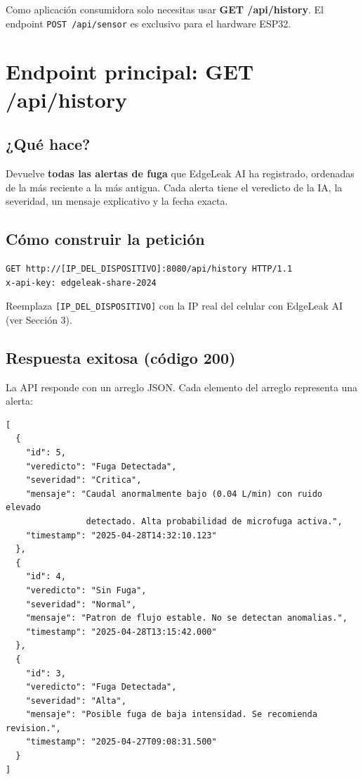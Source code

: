 \documentclass[12pt, a4paper]{article}
\begin{document}
\vspace{0.3cm}
\begin{tcolorbox}[infobox]
  Como aplicación consumidora solo necesitas usar \textbf{GET /api/history}.
  El endpoint \texttt{POST /api/sensor} es exclusivo para el hardware ESP32.
\end{tcolorbox}

\section{Endpoint principal: GET /api/history}

\subsection{¿Qué hace?}

Devuelve \textbf{todas las alertas de fuga} que EdgeLeak AI ha registrado,
ordenadas de la más reciente a la más antigua. Cada alerta tiene el veredicto
de la IA, la severidad, un mensaje explicativo y la fecha exacta.

\subsection{Cómo construir la petición}

\begin{lstlisting}[style=httpStyle, caption={Petición HTTP completa}]
GET http://[IP_DEL_DISPOSITIVO]:8080/api/history HTTP/1.1
x-api-key: edgeleak-share-2024
\end{lstlisting}

Reemplaza \texttt{[IP\_DEL\_DISPOSITIVO]} con la IP real del celular con
EdgeLeak AI (ver Sección 3).

\subsection{Respuesta exitosa (código 200)}

La API responde con un arreglo JSON. Cada elemento del arreglo representa
una alerta:

\begin{lstlisting}[style=jsonStyle, caption={Ejemplo de respuesta exitosa}]
[
  {
    "id": 5,
    "veredicto": "Fuga Detectada",
    "severidad": "Critica",
    "mensaje": "Caudal anormalmente bajo (0.04 L/min) con ruido elevado
                detectado. Alta probabilidad de microfuga activa.",
    "timestamp": "2025-04-28T14:32:10.123"
  },
  {
    "id": 4,
    "veredicto": "Sin Fuga",
    "severidad": "Normal",
    "mensaje": "Patron de flujo estable. No se detectan anomalias.",
    "timestamp": "2025-04-28T13:15:42.000"
  },
  {
    "id": 3,
    "veredicto": "Fuga Detectada",
    "severidad": "Alta",
    "mensaje": "Posible fuga de baja intensidad. Se recomienda revision.",
    "timestamp": "2025-04-27T09:08:31.500"
  }
]
\end{lstlisting}
\end{document}

